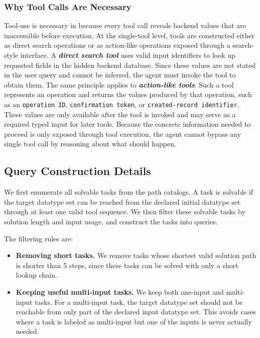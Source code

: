\subsubsection{Why Tool Calls Are Necessary}
\label{app:tools-necessity-details}


Tool-use is necessary in \bench{} because every tool call reveals backend values that are inaccessible before execution.
At the single-tool level, tools are constructed either as direct search operations or as action-like operations exposed through a search-style interface. 
A \textit{\textbf{direct search tool}} uses valid input identifiers to look up requested fields in the hidden backend database. Since these values are not stated in the user query and cannot be inferred, the agent must invoke the tool to obtain them.
The same principle applies to \textit{\textbf{action-like tools}}. 
Such a tool represents an operation and returns the values produced by that operation, such as an \texttt{operation ID}, \texttt{confirmation token}, or \texttt{created-record identifier}.
These values are only available after the tool is invoked and may serve as a required typed input for later tools. 
Because the concrete information needed to proceed is only exposed through tool execution, the agent cannot bypass any single tool call by reasoning about what should happen.

\subsection{Query Construction Details}
\label{app:query-construction-details}


We first enumerate all solvable tasks from the path catalogs. 
A task is solvable if the target datatype set can be reached from the declared initial datatype set through at least one valid tool sequence. 
We then filter these solvable tasks by solution length and input usage, and construct the tasks into queries.

The filtering rules are:
\begin{itemize}
    \item \textbf{Removing short tasks.} We remove tasks whose shortest valid solution path is shorter than 5 steps, since these tasks can be solved with only a short lookup chain.
    \item \textbf{Keeping useful multi-input tasks.} We keep both one-input and multi-input tasks. For a multi-input task, the target datatype set should not be reachable from only part of the declared input datatype set. This avoids cases where a task is labeled as multi-input but one of the inputs is never actually needed.
\end{itemize}

